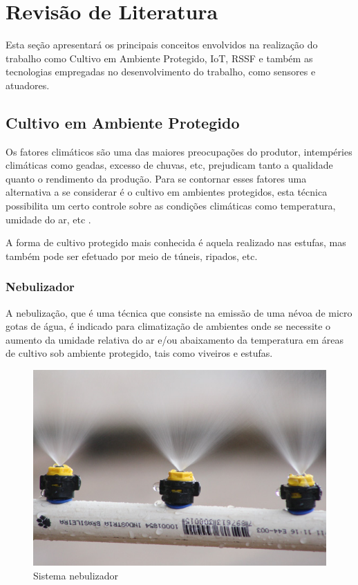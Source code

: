 \chapter{Revisão de Literatura}
Esta seção apresentará os principais conceitos envolvidos na realização do trabalho como Cultivo em Ambiente Protegido, IoT, RSSF e também as tecnologias empregadas no desenvolvimento do trabalho, como sensores e atuadores.

\section{Cultivo em Ambiente Protegido}
Os fatores climáticos são uma das maiores preocupações do produtor, intempéries climáticas como geadas, excesso de chuvas, etc, prejudicam tanto a qualidade quanto o rendimento da produção. Para se contornar esses fatores uma alternativa a se considerar é o cultivo em ambientes protegidos, esta técnica possibilita um certo controle sobre as condições climáticas como temperatura, umidade do ar, etc \cite{silva2014cultivoprotegido}.

A forma de cultivo protegido mais conhecida é aquela realizado nas estufas, mas também pode ser efetuado por meio de túneis, ripados, etc.

\subsection{Nebulizador}

A nebulização, que é uma técnica que consiste na emissão de uma névoa de micro gotas de água, é indicado para climatização de ambientes onde se necessite o aumento da umidade relativa do ar e/ou abaixamento da temperatura em áreas de cultivo sob ambiente protegido, tais como viveiros e estufas. 

\begin{figure}[H]
\centering
\includegraphics[scale=0.5]{04-figuras/nebulizador.jpg}
\begingroup
\caption{Sistema nebulizador}
\vspace{-\baselineskip}
\label{fig:nebulizador}
\endgroup
\end{figure}

